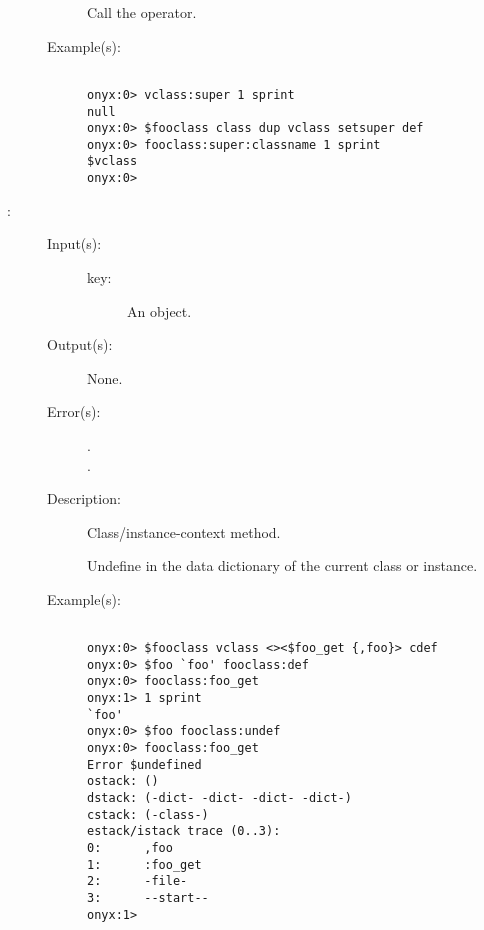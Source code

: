 \begin{description}
\begin{description}
		Call the 
		operator.
	\item[Example(s): ]\begin{verbatim}

onyx:0> vclass:super 1 sprint
null
onyx:0> $fooclass class dup vclass setsuper def
onyx:0> fooclass:super:classname 1 sprint
$vclass
onyx:0>
		\end{verbatim}
	\end{description}
\label{vclass:undef}
\item[{\onyxop{key}{undef}{--}}: ]
	\begin{description}\item[]
	\item[Input(s): ]
		\begin{description}\item[]
		\item[key: ]
			An object.
		\end{description}
	\item[Output(s): ] None.
	\item[Error(s): ]
		\begin{description}\item[]
		\item[.]
		\item[.]
		\end{description}
	\item[Description: ]
		Class/instance-context method.

		Undefine  in the data dictionary of the current class
		or instance.
	\item[Example(s): ]\begin{verbatim}

onyx:0> $fooclass vclass <><$foo_get {,foo}> cdef
onyx:0> $foo `foo' fooclass:def
onyx:0> fooclass:foo_get
onyx:1> 1 sprint
`foo'
onyx:0> $foo fooclass:undef
onyx:0> fooclass:foo_get
Error $undefined
ostack: ()
dstack: (-dict- -dict- -dict- -dict-)
cstack: (-class-)
estack/istack trace (0..3):
0:      ,foo
1:      :foo_get
2:      -file-
3:      --start--
onyx:1>
		\end{verbatim}
	\end{description}
\end{description}
